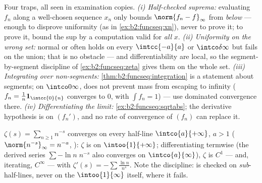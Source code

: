 \begin{remark}
Four traps, all seen in examination copies. \emph{(i)
Half-checked suprema:} evaluating $f_n$ along a well-chosen
sequence $x_n$ only bounds $\norm{f_n - f}_\infty$ from
\emph{below} --- enough to disprove uniformity (as in
\cref{ex:b2:funcseq:xn}), never to prove it; to prove it, bound
the sup by a computation valid for \emph{all} $x$. \emph{(ii)
Uniformity on the wrong set:} normal or 
often holds on every $\intcc{-a}{a}$ or $\intco\delta\infty$
but fails on the  union; that is no obstacle --- 
and differentiability are local, so the segment-by-segment
discipline of \cref{ex:b2:funcseq:zeta} gives them on the whole
 set. \emph{(iii) Integrating over non-segments:}
\cref{thm:b2:funcseq:integration} is a statement about
segments; on $\intco0\infty$,  does not
prevent mass from escaping to infinity ($f_n =
\frac1n\mathbf 1_{\intcc{0}{n}}$ converges  to $0$,
with $\int f_n = 1$) --- use dominated convergence there.
\emph{(iv) Differentiating the limit:}
\cref{ex:b2:funcseq:sqrtabs}; the derivative hypothesis is on
$(f_n')$, and no rate of convergence of $(f_n)$ can replace
it.
\end{remark}

\begin{example}\label{ex:b2:funcseq:zeta}
$\zeta(s) = \sum_{n\geq1} n^{-s}$ converges  on every
half-line $\intco{a}{+\infty}$, $a > 1$ ($\norm{n^{-s}}_\infty =
n^{-a}$, ): $\zeta$ is  on $\intoo{1}{+\infty}$;
differentiating termwise (the derived series $\sum -\ln n\; n^{-s}$
also converges  on $\intco{a}{\infty}$), $\zeta$ is $C^1$
--- and, iterating, $C^\infty$ --- with $\zeta'(s) = -\sum \frac{\ln
n}{n^s}$. Note the discipline:  is checked on
\emph{sub}-half-lines, never on the  $\intoo{1}{\infty}$
itself, where it fails.
\end{example}

